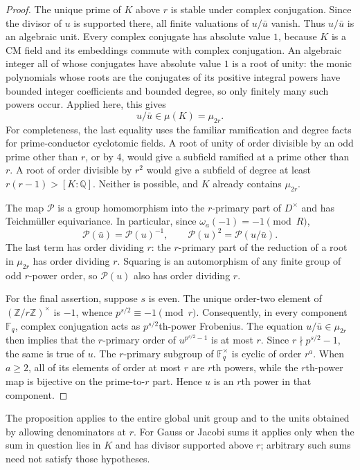 \documentclass[11pt]{article}
\theoremstyle{definition}
\theoremstyle{remark}
\begin{document}
\begin{proof}
The unique prime of $K$ above $r$ is stable under complex
conjugation. Since the divisor of $u$ is supported there, all
finite valuations of $u/\bar u$ vanish. Thus $u/\bar u$ is an
algebraic unit. Every complex conjugate has absolute value $1$,
because $K$ is a CM field and its embeddings commute with
complex conjugation.
An algebraic integer all of whose conjugates have absolute
value $1$ is a root of unity: the monic polynomials whose roots
are the conjugates of its positive integral powers have bounded
integer coefficients and bounded degree, so only finitely many
such powers occur. Applied here, this gives
\[
 u/\bar u\in\mu(K)=\mu_{2r}.
\]
For completeness, the last equality uses the familiar ramification
and degree facts for prime-conductor cyclotomic fields.
A root of unity of order divisible by an odd prime other than
$r$, or by $4$, would give a subfield ramified at a prime other
than $r$. A root of order divisible by $r^2$ would give a
subfield of degree at least $r(r-1)>[K:\mathbb Q]$.
Neither is possible, and $K$ already contains $\mu_{2r}$.

The map $\mathcal P$ is a group homomorphism into the
$r$-primary part of $D^\times$ and has Teichm\"uller
equivariance. In particular, since
$\omega_a(-1)=-1\pmod R$,
\[
 \mathcal P(\bar u)=\mathcal P(u)^{-1},\qquad
 \mathcal P(u)^2=\mathcal P(u/\bar u).
\]
The last term has order dividing $r$: the $r$-primary part of
the reduction of a root in $\mu_{2r}$ has order dividing $r$.
Squaring is an automorphism of any finite group of odd
$r$-power order, so $\mathcal P(u)$ also has order dividing $r$.

For the final assertion, suppose $s$ is even.
The unique order-two element of
$(\mathbb Z/r\mathbb Z)^\times$ is $-1$, whence
$p^{s/2}\equiv-1\pmod r$.
Consequently, in every component $\mathbb F_q$,
complex conjugation acts as $p^{s/2}$th-power Frobenius.
The equation $u/\bar u\in\mu_{2r}$ then implies that the
$r$-primary order of
$u^{p^{s/2}-1}$ is at most $r$.
Since $r\nmid p^{s/2}-1$, the same is true of $u$.
The $r$-primary subgroup of $\mathbb F_q^\times$ is cyclic of
order $r^a$. When $a\ge2$, all of its elements of order at most
$r$ are $r$th powers, while the $r$th-power map is bijective on
the prime-to-$r$ part. Hence $u$ is an $r$th power in that
component.
\end{proof}

The proposition applies to the entire global unit group and to
the units obtained by allowing denominators at $r$.
For Gauss or Jacobi sums it applies only when the sum in question
lies in $K$ and has divisor supported above $r$; arbitrary such
sums need not satisfy those hypotheses.
\end{document}

